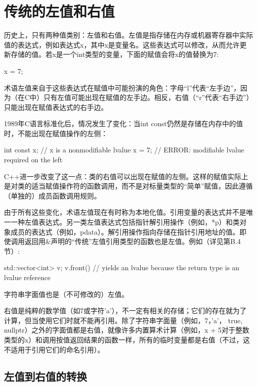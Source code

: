 \section{传统的左值和右值}

历史上，只有两种值类别：左值和右值。左值是指存储在内存或机器寄存器中实际值的表达式，例如表达式x，其中x是变量名。这些表达式可以修改，从而允许更新存储的值。若x是一个int类型的变量，下面的赋值会将x的值替换为7:

\begin{cpp}
x = 7;
\end{cpp}

术语左值来自于这些表达式在赋值中可能扮演的角色：字母“l”代表“左手边”，因为（在C中）只有左值可能出现在赋值的左手边。相反，右值（“r”代表“右手边”）只能出现在赋值表达式的右手边。

1989年C语言标准化后，情况发生了变化：当int const仍然是存储在内存中的值时，不能出现在赋值操作的左侧：

\begin{cpp}
int const x; // x is a nonmodifiable lvalue
x = 7; // ERROR: modifiable lvalue required on the left
\end{cpp}

C++进一步改变了这一点：类的右值可以出现在赋值的左侧。这样的赋值实际上是对类的适当赋值操作符的函数调用，而不是对标量类型的“简单”赋值，因此遵循（单独的）成员函数调用规则。

由于所有这些变化，术语左值现在有时称为本地化值。引用变量的表达式并不是唯一一种左值表达式。另一类左值表达式包括指针解引用操作（例如，*p）和类对象成员的表达式（例如，p\inlcpp{->}data）。解引用操作指向存储在指针引用地址的值。即使调用返回用\&声明的“传统”左值引用类型的函数也是左值。例如（详见第B.4节）:

\begin{cpp}
std::vector<int> v;
v.front() // yields an lvalue because the return type is an lvalue reference
\end{cpp}

字符串字面值也是（不可修改的）左值。

右值是纯粹的数学值（如7或字符'a'），不一定有相关的存储；它们的存在就为了计算，但当使用它们时就不能再引用。除了字符串字面量（例如，7，'a'， true, nullptr）之外的字面值都是右值，就像许多内置算术计算（例如，x + 5对于整数类型的x）和调用按值返回结果的函数一样，所有的临时变量都是右值（不过，这不适用于引用它们的命名引用）。

\subsection{左值到右值的转换}

